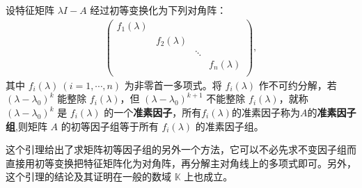 \documentclass[../../main.tex]{subfiles}
\begin{document}
\begin{lemma}\label{lemma:初等因子组等于准素因子组}
设特征矩阵 $\lambda I - A$ 经过初等变换化为下列对角阵：
\begin{align}\label{equation7629}
\left( \begin{matrix}
f_1(\lambda )&		&		&		\\
&		f_2(\lambda )&		&		\\
&		&		\ddots&		\\
&		&		&		f_n(\lambda )\\
\end{matrix} \right) ,
\end{align}
其中 $f_i(\lambda)\ (i = 1,\cdots,n)$ 为非零首一多项式。将 $f_i(\lambda)$ 作不可约分解，若 $(\lambda - \lambda_0)^k$ 能整除 $f_i(\lambda)$，但 $(\lambda - \lambda_0)^{k + 1}$ 不能整除 $f_i(\lambda)$，就称 $(\lambda - \lambda_0)^k$ 是 $f_i(\lambda)$ 的一个\textbf{准素因子}，所有$f_i(\lambda)$的准素因子称为$A$的\textbf{准素因子组},则矩阵 $A$ 的初等因子组等于所有 $f_i(\lambda)$ 的准素因子组。
\end{lemma}
\begin{remark}
这个引理给出了求矩阵初等因子组的另外一个方法，它可以不必先求不变因子组而直接用初等变换把特征矩阵化为对角阵，再分解主对角线上的多项式即可。另外，这个引理的结论及其证明在一般的数域 $\mathbb{K}$ 上也成立。 
\end{remark}
\end{document}
